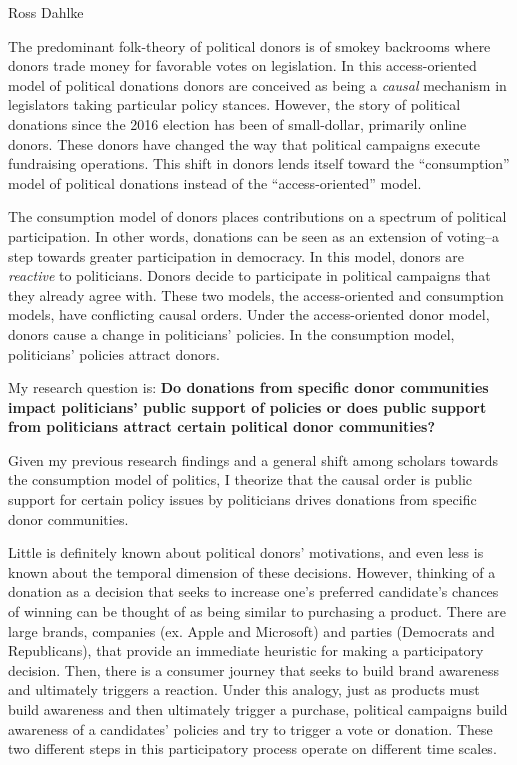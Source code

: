 \documentclass[12pt,]{article}
\author{\Large Ross Dahlke\vspace{0.05in} \newline\normalsize\emph{}  }
\date{}
\begin{document}
	
%




\vskip -8.5pt



\noindent \doublespacing 

Ross Dahlke

The predominant folk-theory of political donors is of smokey backrooms
where donors trade money for favorable votes on legislation. In this
access-oriented model of political donations donors are conceived as
being a \emph{causal} mechanism in legislators taking particular policy
stances. However, the story of political donations since the 2016
election has been of small-dollar, primarily online donors. These donors
have changed the way that political campaigns execute fundraising
operations. This shift in donors lends itself toward the ``consumption''
model of political donations instead of the ``access-oriented'' model.

The consumption model of donors places contributions on a spectrum of
political participation. In other words, donations can be seen as an
extension of voting--a step towards greater participation in democracy.
In this model, donors are \emph{reactive} to politicians. Donors decide
to participate in political campaigns that they already agree with.
These two models, the access-oriented and consumption models, have
conflicting causal orders. Under the access-oriented donor model, donors
cause a change in politicians' policies. In the consumption model,
politicians' policies attract donors.

My research question is: \textbf{Do donations from specific donor
communities impact politicians' public support of policies or does
public support from politicians attract certain political donor
communities?}

Given my previous research findings and a general shift among scholars
towards the consumption model of politics, I theorize that the causal
order is public support for certain policy issues by politicians drives
donations from specific donor communities.

Little is definitely known about political donors' motivations, and even
less is known about the temporal dimension of these decisions. However,
thinking of a donation as a decision that seeks to increase one's
preferred candidate's chances of winning can be thought of as being
similar to purchasing a product. There are large brands, companies (ex.
Apple and Microsoft) and parties (Democrats and Republicans), that
provide an immediate heuristic for making a participatory decision.
Then, there is a consumer journey that seeks to build brand awareness
and ultimately triggers a reaction. Under this analogy, just as products
must build awareness and then ultimately trigger a purchase, political
campaigns build awareness of a candidates' policies and try to trigger a
vote or donation. These two different steps in this participatory
process operate on different time scales.
\end{document}
